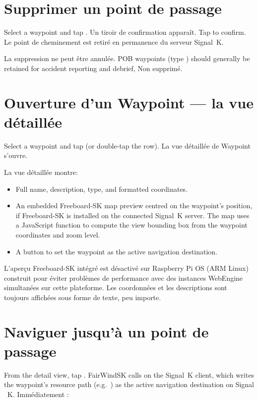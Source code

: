 \section{Supprimer un point de passage}

Select a waypoint and tap .
Un tiroir de confirmation apparaît.
Tap  to confirm.
Le point de cheminement est retiré en permanence du serveur Signal~K.

\begin{warningbox}
La suppression ne peut être annulée.
POB waypoints (type ) should generally be retained for accident reporting and debrief,
Non supprimé.
\end{warningbox}

\section{Ouverture d'un Waypoint --- la vue détaillée}

Select a waypoint and tap  (or double-tap the row).
La vue détaillée de Waypoint s'ouvre.


La vue détaillée montre:

\begin{itemize}
  \item Full name, description, type, and formatted coordinates.
  \item An embedded Freeboard-SK map preview centred on the waypoint's position, if Freeboard-SK is installed on the connected Signal~K server. The map uses a JavaScript function to compute the view bounding box from the waypoint coordinates and zoom level.
  \item A  button to set the waypoint as the active navigation destination.
\end{itemize}

\begin{notebox}
L'aperçu Freeboard-SK intégré est désactivé sur Raspberry Pi OS (ARM Linux) construit pour éviter
problèmes de performance avec des instances WebEngine simultanées sur cette plateforme.
Les coordonnées et les descriptions sont toujours affichées sous forme de texte, peu importe.
\end{notebox}

\section{Naviguer jusqu'à un point de passage}

From the detail view, tap .
FairWindSK calls  on the Signal~K client, which writes the waypoint's
resource path (e.g.\ ) as the active navigation destination on
Signal ~K.
Immédiatement :

